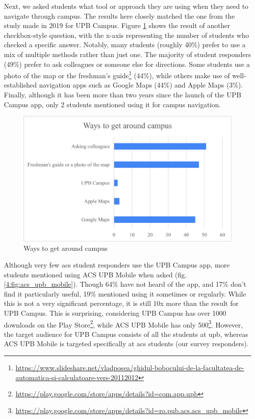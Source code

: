         \newpage
        
        Next, we asked students what tool or approach they are using when they need to navigate through campus. The results here closely matched the one from the study made in 2019 for UPB Campus\cite{scurtu2020upb}. Figure \ref{4:fig:navigation_methods} shows the result of another checkbox-style question, with the x-axis representing the number of students who checked a specific answer. Notably, many students (roughly 40\%) prefer to use a mix of multiple methods rather than just one. The majority of student responders (49\%) prefer to ask colleagues or someone else for directions. Some students use a photo of the map or the freshman's guide\footnote{\url{https://www.slideshare.net/vladposea/ghidul-bobocului-de-la-facultatea-de-automatica-si-calculatoare-vers-20112012}} (44\%), while others make use of well-established navigation apps such as Google Maps (44\%) and Apple Maps (3\%). Finally, although it has been more than two years since the launch of the UPB Campus app, only 2 students mentioned using it for campus navigation.
            
        \begin{figure}[!ht]
            \centering
            \includegraphics[width=\textwidth]{figures/charts/navigation_methods.png}
            \caption{Ways to get around campus}
            \label{4:fig:navigation_methods}
        \end{figure}
        
        Although very few \acrshort{acs} student responders use the UPB Campus app, more students mentioned using ACS UPB Mobile when asked (fig. \ref{4:fig:acs_upb_mobile}). Though 64\% have not heard of the app, and 17\% don't find it particularly useful, 19\% mentioned using it sometimes or regularly. While this is not a very significant percentage, it is still 10x more than the result for UPB Campus. This is surprising, considering UPB Campus has over 1000 downloads on the Play Store\footnote{\url{https://play.google.com/store/apps/details?id=com.app.upb}}, while ACS UPB Mobile has only 500\footnote{\url{https://play.google.com/store/apps/details?id=ro.pub.acs.acs_upb_mobile}}. However, the target audience for UPB Campus consists of all the students at \acrshort{upb}, whereas ACS UPB Mobile is targeted specifically at \acrshort{acs} students (our survey responders).
            
